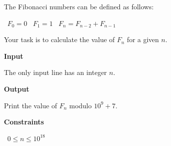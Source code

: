 The Fibonacci numbers can be defined as follows:

\textbullet\ $F_0=0$
\textbullet\ $F_1=1$
\textbullet\ $F_n = F_{n-2}+F_{n-1}$

Your task is to calculate the value of $F_n$ for a given $n$.

\vspace{0.3cm}\noindent\textbf{Input}

The only input line has an integer $n$.

\vspace{0.3cm}\noindent\textbf{Output}

Print the value of $F_n$ modulo $10^9+7$.

\vspace{0.3cm}\noindent\textbf{Constraints}

\textbullet\ $0 \le n \le 10^{18}$